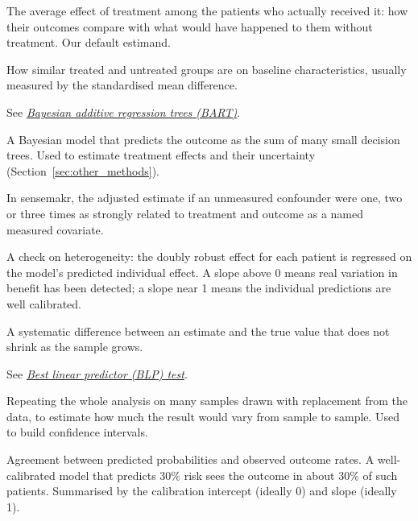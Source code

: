 \begin{description}[style=nextline, leftmargin=1.2em, itemsep=3pt, font=\normalfont\bfseries]
\item[Average treatment effect in the treated (ATT)]\label{gl:att}
The average effect of treatment among the patients who actually received it: how their outcomes compare with what would have happened to them without treatment. Our default estimand.

\item[Balance]
How similar treated and untreated groups are on baseline characteristics, usually measured by the standardised mean difference.

\item[BART]
See \emph{\hyperref[gl:bart]{Bayesian additive regression trees (BART)}}.

\item[Bayesian additive regression trees (BART)]\label{gl:bart}
A Bayesian model that predicts the outcome as the sum of many small decision trees. Used to estimate treatment effects and their uncertainty (Section~\ref{sec:other_methods}).

\item[Benchmark bounds]
In sensemakr, the adjusted estimate if an unmeasured confounder were one, two or three times as strongly related to treatment and outcome as a named measured covariate.

\item[Best linear predictor (BLP) test]\label{gl:blp}
A check on heterogeneity: the doubly robust effect for each patient is regressed on the model's predicted individual effect. A slope above 0 means real variation in benefit has been detected; a slope near 1 means the individual predictions are well calibrated.

\item[Bias]
A systematic difference between an estimate and the true value that does not shrink as the sample grows.

\item[BLP]
See \emph{\hyperref[gl:blp]{Best linear predictor (BLP) test}}.

\item[Bootstrap]
Repeating the whole analysis on many samples drawn with replacement from the data, to estimate how much the result would vary from sample to sample. Used to build confidence intervals.

\item[Calibration]
Agreement between predicted probabilities and observed outcome rates. A well-calibrated model that predicts 30\% risk sees the outcome in about 30\% of such patients. Summarised by the calibration intercept (ideally 0) and slope (ideally 1).


\end{description}
